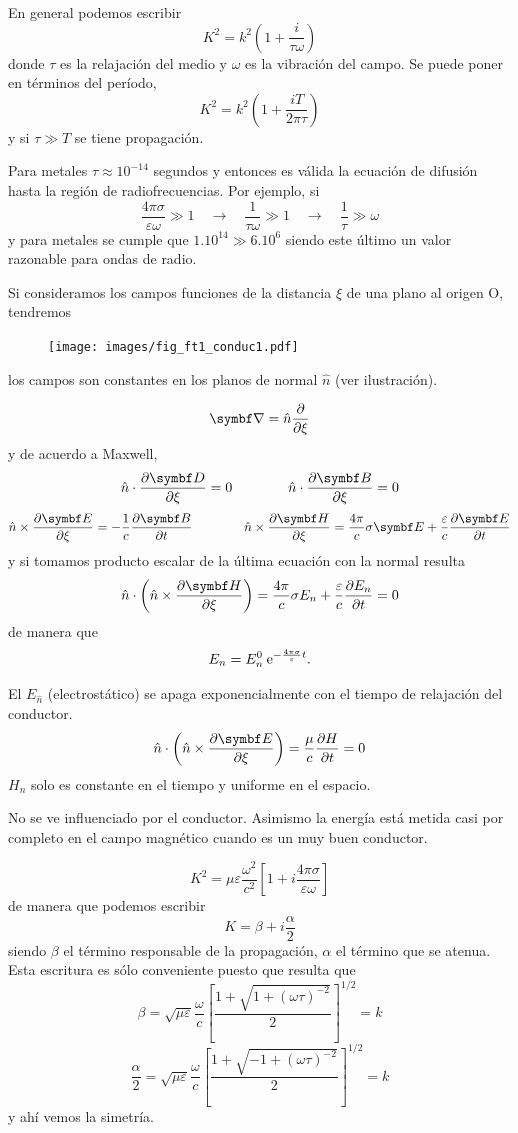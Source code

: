 \documentclass[10pt,oneside]{CBFT_book}
\begin{document}
En general podemos escribir
\[
	K^2 = k^2 \left( 1 + \frac{i}{\tau \omega} \right)
\]
donde $\tau$ es la relajación del medio y $\omega$ es la vibración del campo. Se puede poner en
términos del período,
\[
	K^2 = k^2 \left( 1 + \frac{iT}{ 2 \pi \tau } \right)
\]
y si $\tau \gg T$ se tiene propagación.

Para metales $\tau \approx 10^{-14}$ segundos y entonces es válida la ecuación de difusión
hasta la región de radiofrecuencias. Por ejemplo, si 
\[
	\frac{4\pi\sigma}{\varepsilon\omega} \gg 1 \quad \rightarrow \quad \frac{1}{\tau\omega} \gg 1 
			\quad \rightarrow \quad \frac{1}{\tau} \gg \omega
\]
y para metales se cumple que $1.10^{14} \gg 6.10^6$ siendo este último un valor razonable para ondas de radio.


Si consideramos los campos funciones de la distancia $\xi$ de una plano al origen O,
tendremos 

\begin{figure}[htb]
	\begin{center}
	\texttt{[image: images/fig\_ft1\_conduc1.pdf]}	 
	\end{center}
	\caption{}
\end{figure} 
los campos son constantes en los planos de normal $\hat{n}$ (ver ilustración).

\[
	\Nabla = \hat{n} \dpar{}{\xi}
\]
y de acuerdo a Maxwell,
\[
	\hat{n} \cdot \dpar{\vb{D}}{\xi} = 0 \qquad \qquad \hat{n} \cdot \dpar{\vb{B}}{\xi} = 0
\]
\[
	\hat{n} \times \dpar{\vb{E}}{\xi} = -\frac{1}{c} \dpar{\vb{B}}{t} \qquad \qquad
	\hat{n} \times \dpar{\vb{H}}{\xi} = \frac{4\pi}{c} \sigma \vb{E} + \frac{\varepsilon}{c} 
\dpar{\vb{E}}{t}
\]
y si tomamos producto escalar de la última ecuación con la normal resulta
\[
	\hat{n} \cdot \left( \hat{n} \times \dpar{\vb{H}}{\xi} \right) = 
		\frac{4\pi}{c} \sigma E_n + \frac{\varepsilon}{c} \dpar{E_n}{t} = 0 
\]
de manera que 
\[
	E_n = E_n^0 \:\mathrm{e}^{-\frac{4\pi\sigma}{\varepsilon} t}.
\]

El $E_{\hat{n}}$ (electrostático) se apaga exponencialmente con el tiempo de relajación
del conductor. 
\[
	\hat{n} \cdot \left( \hat{n} \times \dpar{\vb{E}}{\xi} \right) = \frac{\mu}{c} \dpar{H}{t} = 0
\]
$H_n$ solo es constante en el tiempo y uniforme en el espacio.

No se ve influenciado por el conductor. Asimismo la energía está metida casi por
completo en el campo magnético cuando es un muy buen conductor.

\[
	K^2 = \mu \varepsilon \frac{\omega^2}{c^2} \left[ 1 + i\frac{4\pi\sigma}{\varepsilon \omega} \right]
\]
de manera que podemos escribir
\[
	K = \beta + i \frac{\alpha}{2}
\]
siendo $\beta$ el término responsable de la propagación, $\alpha$ el término que se atenua. Esta escritura
es sólo conveniente puesto que resulta que 
\[
	\beta = \sqrt{ \mu \varepsilon }\frac{\omega}{c} 
	\left[ \frac{1 + \sqrt{ 1 + (\omega\tau )^{-2}}}{2}\right]^{1/2} = k
\]
\[
	\frac{\alpha}{2} = \sqrt{ \mu \varepsilon }\frac{\omega}{c} 
	\left[ \frac{1 + \sqrt{ -1 + (\omega\tau )^{-2}}}{2}\right]^{1/2} = k
\]
y ahí vemos la simetría.
\end{document}
